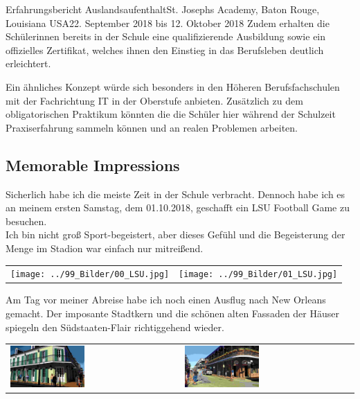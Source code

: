 \documentclass[oneside,openany,headings=optiontotoc,11pt,numbers=noenddot]{article}
\begin{document}
\begin{worksheet}{Erfahrungsbericht Auslandsaufenthalt}{St. Joseph\grq{}s Academy, Baton Rouge, Louisiana USA}{22. September 2018 bis 12. Oktober 2018}
		Zudem erhalten die Schülerinnen bereits in der Schule eine qualifizierende Ausbildung sowie ein offizielles Zertifikat, welches ihnen den Einstieg in das Berufsleben deutlich erleichtert.\\
		\par\noindent
		Ein ähnliches Konzept würde sich besonders in den Höheren Berufsfachschulen mit der Fachrichtung IT in der Oberstufe anbieten. Zusätzlich zu dem obligatorischen Praktikum könnten die die Schüler hier während der Schulzeit Praxiserfahrung sammeln können und an realen Problemen arbeiten.
		\subsection{Memorable Impressions}
		Sicherlich habe ich die meiste Zeit in der Schule verbracht. Dennoch habe ich es an meinem ersten Samstag, dem 01.10.2018, geschafft ein LSU Football Game zu besuchen.\\
		Ich bin nicht groß Sport-begeistert, aber dieses Gefühl und die Begeisterung der Menge im Stadion war einfach nur mitreißend.\\
		\begin{center}
			\begin{tabularx}{\textwidth}{XX}
				\texttt{[image: ../99\_Bilder/00\_LSU.jpg]} & \texttt{[image: ../99\_Bilder/01\_LSU.jpg]}
			\end{tabularx}
		\end{center}
		Am Tag vor meiner Abreise habe ich noch einen Ausflug nach New Orleans gemacht. Der imposante Stadtkern und die schönen alten Fassaden der Häuser spiegeln den Südstaaten-Flair richtiggehend wieder.\\
		\begin{center}
			\begin{tabularx}{\textwidth}{XX}
				\includegraphics[width=0.45\textwidth]{../99_Bilder/00_trip.jpg} & \includegraphics[width=0.45\textwidth]{../99_Bilder/01_trip.jpg} 

\end{tabularx}
\end{center}
\end{worksheet}
\end{document}
